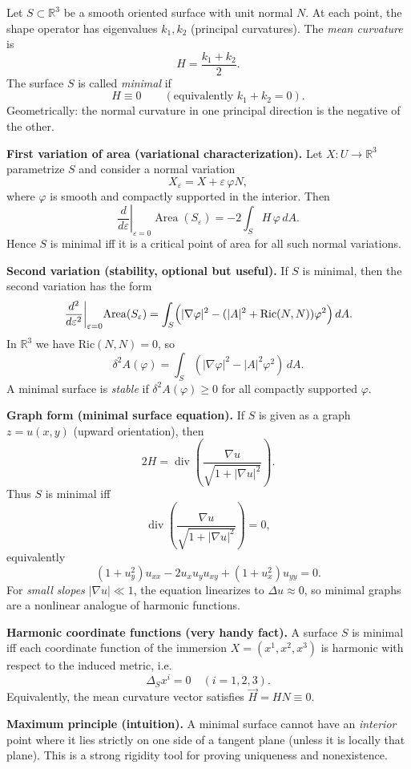 \documentclass[12pt,a4paper]{article}
\theoremstyle{plain}
\theoremstyle{definition}      %
\begin{document}
	Let $S\subset\mathbb{R}^3$ be a smooth oriented surface with unit normal $N$.
	At each point, the shape operator has eigenvalues $k_1,k_2$ (principal curvatures).
	The \emph{mean curvature} is
	\[
	H=\frac{k_1+k_2}{2}.
	\]
	The surface $S$ is called \emph{minimal} if
	\[
	H\equiv 0 \qquad (\text{equivalently } k_1+k_2=0).
	\]
	Geometrically: the normal curvature in one principal direction is the negative of the other.
	
	\medskip
	\textbf{First variation of area (variational characterization).}
	Let $X\colon U\to\mathbb{R}^3$ parametrize $S$ and consider a normal variation
	\[
	X_\varepsilon = X+\varepsilon\,\varphi N,
	\]
	where $\varphi$ is smooth and compactly supported in the interior.
	Then
	\[
	\left.\frac{d}{d\varepsilon}\right|_{\varepsilon=0}\!\operatorname{Area}(S_\varepsilon)
	= -2\int_S H\,\varphi\, dA.
	\]
	Hence $S$ is minimal iff it is a critical point of area for all such normal variations.
	
	\medskip
	\textbf{Second variation (stability, optional but useful).}
	If $S$ is minimal, then the second variation has the form
	\[
	\left.\frac{d^2}{d\varepsilon^2}\right|_{\varepsilon=0}\!\operatorname{Area}(S_\varepsilon)
	= \int_S \Bigl(|\nabla \varphi|^2 - (|A|^2+\mathrm{Ric}(N,N))\varphi^2\Bigr)\,dA.
	\]
	In $\mathbb{R}^3$ we have $\mathrm{Ric}(N,N)=0$, so
	\[
	\delta^2 A(\varphi)=\int_S \left(|\nabla\varphi|^2-|A|^2\varphi^2\right)\,dA.
	\]
	A minimal surface is \emph{stable} if $\delta^2A(\varphi)\ge 0$ for all compactly supported $\varphi$.
	
	\medskip
	\textbf{Graph form (minimal surface equation).}
	If $S$ is given as a graph $z=u(x,y)$ (upward orientation), then
	\[
	2H=\operatorname{div}\!\left(\frac{\nabla u}{\sqrt{1+|\nabla u|^2}}\right).
	\]
	Thus $S$ is minimal iff
	\[
	\operatorname{div}\!\left(\frac{\nabla u}{\sqrt{1+|\nabla u|^2}}\right)=0,
	\]
	equivalently
	\[
	(1+u_y^2)u_{xx}-2u_xu_yu_{xy}+(1+u_x^2)u_{yy}=0.
	\]
	For \emph{small slopes} $|\nabla u|\ll 1$, the equation linearizes to $\Delta u \approx 0$,
	so minimal graphs are a nonlinear analogue of harmonic functions.
	
	\medskip
	\textbf{Harmonic coordinate functions (very handy fact).}
	A surface $S$ is minimal iff each coordinate function of the immersion
	$X=(x^1,x^2,x^3)$ is harmonic with respect to the induced metric, i.e.
	\[
	\Delta_S x^i = 0 \quad (i=1,2,3).
	\]
	Equivalently, the mean curvature vector satisfies $\vec H = HN \equiv 0$.
	
	\medskip
	\textbf{Maximum principle (intuition).}
	A minimal surface cannot have an \emph{interior} point where it lies strictly on one side of a tangent plane
	(unless it is locally that plane). This is a strong rigidity tool for proving uniqueness and nonexistence.
	
\end{document}
